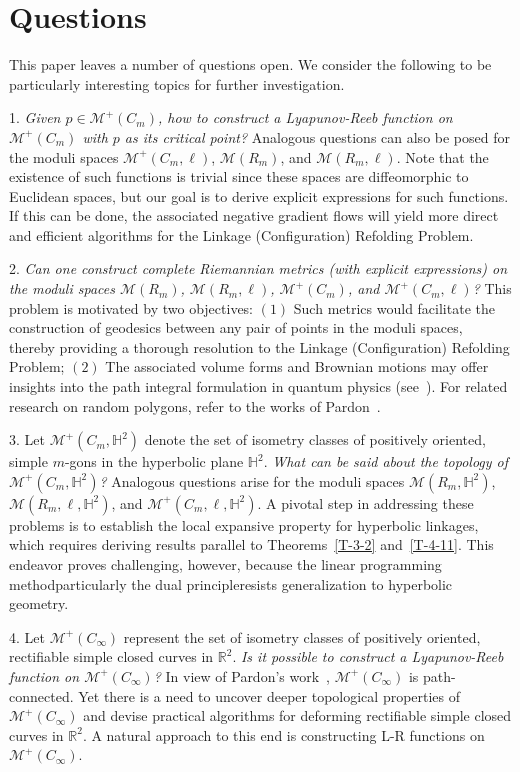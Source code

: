 \documentclass[11pt,letterpaper]{amsart}
\theoremstyle{plain}
\theoremstyle{definition}
\theoremstyle{remark}
\numberwithin{equation}{section}
\begin{document}
\section{Questions}\label{S-6}
This paper leaves a number of questions open. We consider the following to be particularly interesting topics for further investigation.

1. \emph{Given $p\in \mathcal M^{+}(C_m)$, how to construct a Lyapunov-Reeb function on $\mathcal M^{+}(C_m)$ with $p$ as its critical point?} Analogous questions can also be posed for the moduli spaces $\mathcal M^{+}(C_m,\ell)$, $\mathcal M(R_m)$, and $\mathcal M(R_m,\ell)$. Note that the existence of such functions is trivial since these spaces are diffeomorphic to Euclidean spaces, but our goal is to derive explicit expressions for such functions. If this can be done, the associated negative gradient flows will yield more direct and efficient algorithms for the Linkage (Configuration) Refolding Problem.

2. \emph{Can one construct complete Riemannian metrics (with explicit expressions) on the moduli spaces $\mathcal M(R_m)$,  $\mathcal M(R_m,\ell)$, $\mathcal M^{+}(C_m)$, and $\mathcal M^{+}(C_m,\ell)$?} This problem is motivated by two objectives: $(1)$ Such metrics would facilitate the construction of geodesics between any pair of points in the moduli spaces, thereby providing a thorough resolution to the Linkage (Configuration) Refolding Problem; $(2)$ The associated volume forms and Brownian motions may offer insights into the path integral formulation in quantum physics (see~\cite{Charles-2010}). For related research on random polygons, refer to the works of Pardon~\cite{Pardon-2011,Pardon-2012}.


3. Let $\mathcal M^{+}(C_m,\mathbb H^2)$ denote the set of isometry classes of positively oriented, simple $m$-gons in the hyperbolic plane $\mathbb H^2$. \emph{What can be said about the topology of  $\mathcal M^{+}(C_m,\mathbb H^2)$?} Analogous questions arise for the moduli spaces
$\mathcal M(R_m,\mathbb H^2)$, $\mathcal M(R_m,\ell, \mathbb H^2)$,
and $\mathcal M^{+}(C_m,\ell, \mathbb H^2)$. A pivotal step in addressing these problems is to establish the local expansive property for hyperbolic linkages, which requires deriving results parallel to Theorems~\ref{T-3-2} and~\ref{T-4-11}. This endeavor proves challenging, however, because the linear programming method\textemdash particularly the dual principle\textemdash resists generalization to hyperbolic geometry.


4. Let $\mathcal M^{+}(C_\infty)$ represent the set of isometry classes of positively oriented, rectifiable simple closed curves in $\mathbb R^2$. \emph{Is it possible to construct a Lyapunov-Reeb function on $\mathcal M^{+}(C_\infty)$?} In view of Pardon's work~\cite{Pardon-2009}, $\mathcal M^{+}(C_\infty)$ is path-connected. Yet there is a need to uncover deeper topological properties of $\mathcal M^{+}(C_\infty)$ and devise practical algorithms for deforming rectifiable simple closed curves in $\mathbb R^2$. A natural approach to this end is constructing L-R functions on $\mathcal M^{+}(C_\infty)$.
\end{document}
